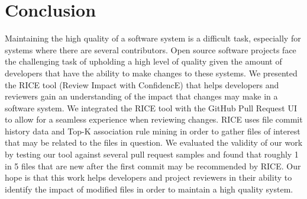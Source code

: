 
\section{Conclusion}
\label{sec:conclusion}

Maintaining the high quality of a software system is a difficult task, especially for systems where there are several contributors. Open source software projects face the challenging task of upholding a high level of quality given the amount of developers that have the ability to make changes to these systems. We presented the RICE tool (Review Impact with ConfidencE) that helps developers and reviewers gain an understanding of the impact that changes may make in a software system. We integrated the RICE tool with the GitHub Pull Request UI to allow for a seamless experience when reviewing changes. RICE uses file commit history data and Top-K association rule mining in order to gather files of interest that may be related to the files in question. We evaluated the validity of our work by testing our tool against several pull request samples and found that roughly 1 in 5 files that are new after the first commit may be recommended by RICE. Our hope is that this work helps developers and project reviewers in their ability to identify the impact of modified files in order to maintain a high quality system.

